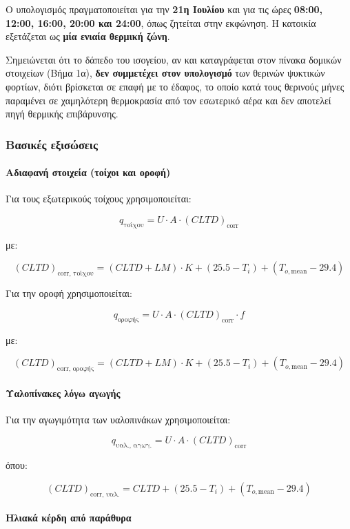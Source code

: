 \documentclass[12pt,a4paper]{article}
\begin{document}
Ο υπολογισμός πραγματοποιείται για την \textbf{21η Ιουλίου} και για τις ώρες
\textbf{08:00, 12:00, 16:00, 20:00 και 24:00}, όπως ζητείται στην εκφώνηση. Η
κατοικία εξετάζεται ως \textbf{μία ενιαία θερμική ζώνη}.

Σημειώνεται ότι το δάπεδο του ισογείου, αν και καταγράφεται στον πίνακα δομικών
στοιχείων (Βήμα 1α), \textbf{δεν συμμετέχει στον υπολογισμό} των θερινών ψυκτικών
φορτίων, διότι βρίσκεται σε επαφή με το έδαφος, το οποίο κατά τους θερινούς μήνες
παραμένει σε χαμηλότερη θερμοκρασία από τον εσωτερικό αέρα και δεν αποτελεί πηγή
θερμικής επιβάρυνσης.

\subsubsection{Βασικές εξισώσεις}

\paragraph{Αδιαφανή στοιχεία (τοίχοι και οροφή)}
Για τους εξωτερικούς τοίχους χρησιμοποιείται:

\[
q_{\text{τοίχου}} = U \cdot A \cdot (CLTD)_{\text{corr}}
\]

με:

\[
(CLTD)_{\text{corr, τοίχου}} =
(CLTD + LM)\cdot K + (25.5 - T_i) + (T_{o,\mathrm{mean}} - 29.4)
\]

Για την οροφή χρησιμοποιείται:

\[
q_{\text{οροφής}} = U \cdot A \cdot (CLTD)_{\text{corr}} \cdot f
\]

με:

\[
(CLTD)_{\text{corr, οροφής}} =
(CLTD + LM)\cdot K + (25.5 - T_i) + (T_{o,\mathrm{mean}} - 29.4)
\]

\paragraph{Υαλοπίνακες λόγω αγωγής}
Για την αγωγιμότητα των υαλοπινάκων χρησιμοποιείται:

\[
q_{\text{υαλ., αγωγ.}} = U \cdot A \cdot (CLTD)_{\text{corr}}
\]

όπου:

\[
(CLTD)_{\text{corr, υαλ.}} = CLTD + (25.5 - T_i) + (T_{o,\mathrm{mean}} - 29.4)
\]

\paragraph{Ηλιακά κέρδη από παράθυρα}
\end{document}
